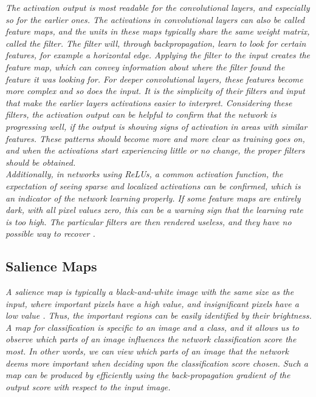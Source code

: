 \textit{The activation output is most readable for the convolutional layers, and especially so for the earlier ones. The activations in convolutional layers can also be called feature maps, and the units in these maps typically share the same weight matrix, called the filter. The filter will, through backpropagation, learn to look for certain features, for example a horizontal edge. Applying the filter to the input creates the feature map, which can convey information about where the filter found the feature it was looking for. For deeper convolutional layers, these features become more complex and so does the input. It is the simplicity of their filters and input that make the earlier layers activations easier to interpret. Considering these filters, the activation output can be helpful to confirm that the network is progressing well, if the output is showing signs of activation in areas with similar features. These patterns should become more and more clear as training goes on, and when the activations start experiencing little or no change, the proper filters should be obtained.} \\

\noindent \textit{Additionally, in networks using ReLUs, a common activation function, the expectation of seeing sparse and localized activations can be confirmed, which is an indicator of the network learning properly. If some feature maps are entirely dark, with all pixel values zero, this can be a warning sign that the learning rate is too high. The particular filters are then rendered useless, and they have no possible way to recover \cite{cs231n_act}. }

\subsection{Salience Maps}

\textit{A salience map is typically a black-and-white image with the same size as the input, where important pixels have a high value, and insignificant pixels have a low value \cite{salience}. Thus, the important regions can be easily identified by their brightness. A map for classification is specific to an image and a class, and it allows us to observe which parts of an image influences the network classification score the most. In other words, we can view which parts of an image that the network deems more important when deciding upon the classification score chosen. Such a map can be produced by efficiently using the back-propagation gradient of the output score with respect to the input image.} \\

